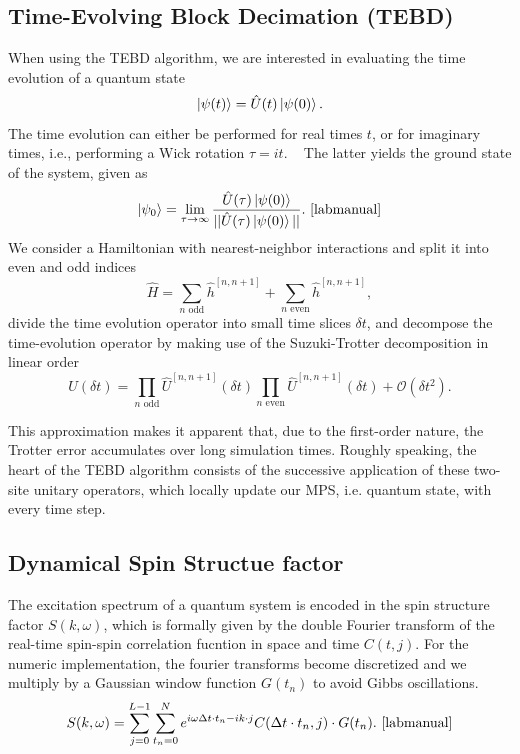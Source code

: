 \subsection{Time-Evolving Block Decimation (TEBD)}
When using the TEBD algorithm, we are interested in evaluating the time evolution of a quantum state
\begin{equation*}
    \ket{\psi(t)} = \hat{U}(t) \ket{\psi(0)}.
\end{equation*}
The time evolution can either be performed for real times $t$, or for imaginary times, i.e., 
performing a Wick rotation $\tau = i t$. ~\cite{Coleman_2015}
The latter yields the ground state of the system, given as 
\begin{equation*}
    \ket{\psi_0} = \lim_{\tau \to \infty} \frac{\hat{U}(\tau) \ket{\psi (0)}}{|| \hat{U}(\tau) \ket{\psi (0)}  ||}. \text{~\cite{labmanual}}
\end{equation*}
We consider a Hamiltonian with nearest-neighbor interactions and split it into even and odd indices 
\begin{equation*}
    \hat{H} = \sum_{n \text{ odd}} \hat{h}^{[n, n+1]} + \sum_{n \text{ even}} \hat{h}^{[n, n+1]},
\end{equation*}
divide the time evolution operator into small time slices $\delta t$, and  decompose the time-evolution operator by making use of the Suzuki-Trotter decomposition in linear order
\begin{equation}
    \hat{U}(\delta t) = \prod_{n \text{ odd}} \hat{U}^{[n, n+1]} (\delta t) \prod_{n \text{ even}} \hat{U}^{[n, n+1]} (\delta t) + \mathcal{O}(\delta t^2).
\end{equation}

This approximation makes it apparent that, due to the first-order nature, the Trotter error
accumulates over long simulation times.
Roughly speaking, the heart of the TEBD algorithm consists of the successive application of these two-site
unitary operators, which locally update our MPS, i.e. quantum state, with every time step. ~\cite{Hauschild2018}

\subsection{Dynamical Spin Structue factor}

The excitation spectrum of a quantum system is encoded in the spin structure factor $S(k, \omega)$, which is formally given by
the double Fourier transform of the real-time spin-spin correlation fucntion in space and time $C(t,j)$. For the numeric implementation,
the fourier transforms become discretized and we multiply by a Gaussian window function $G(t_n)$ to avoid Gibbs oscillations.
\begin{equation*}
    S(k, \omega) = \sum_{j=0}^{L-1} \sum_{t_n = 0}^N e^{i \omega \Delta t \cdot t_n - i k \cdot j} C (\Delta t \cdot t_n, j) \cdot G(t_n). \text{~\cite{labmanual}}
\end{equation*} 